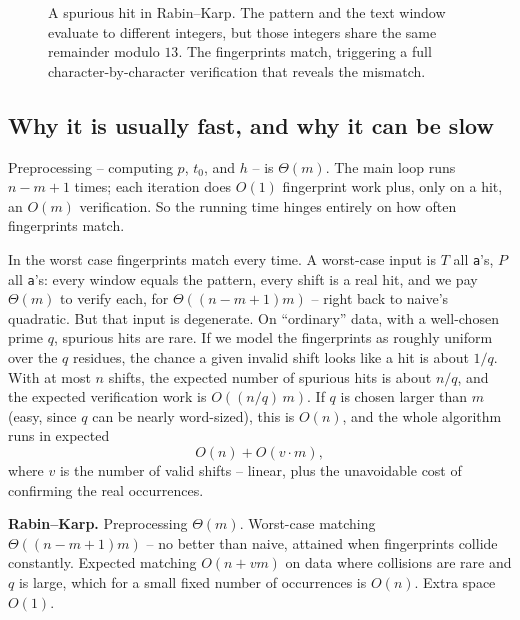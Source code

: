 \begin{labbox}
\begin{figure}[H]
\caption{A spurious hit in Rabin--Karp. The pattern and the text window evaluate to different integers, but those integers share the same remainder modulo $13$. The fingerprints match, triggering a full character-by-character verification that reveals the mismatch.}
\label{ch31:fig-spurious}
\end{figure}
\end{labbox}

\subsection{Why it is usually fast, and why it can be slow}

Preprocessing -- computing $p$, $t_0$, and $h$ -- is $\Theta(m)$. The main loop
runs $n-m+1$ times; each iteration does $O(1)$ fingerprint work plus, only on a
hit, an $O(m)$ verification. So the running time hinges entirely on how often
fingerprints match.

In the worst case fingerprints match every time. A worst-case input is $T$ all
\texttt{a}'s, $P$ all \texttt{a}'s: every window equals the pattern, every shift
is a real hit, and we pay $\Theta(m)$ to verify each, for $\Theta((n-m+1)m)$ --
right back to naive's quadratic. But that input is degenerate. On ``ordinary''
data, with a well-chosen prime $q$, spurious hits are rare. If we model the
fingerprints as roughly uniform over the $q$ residues, the chance a given
invalid shift looks like a hit is about $1/q$. With at most $n$ shifts, the
expected number of spurious hits is about $n/q$, and the expected verification
work is $O((n/q)\,m)$. If $q$ is chosen larger than $m$ (easy, since $q$ can be
nearly word-sized), this is $O(n)$, and the whole algorithm runs in expected
\[
  O(n) + O(v\cdot m),
\]
where $v$ is the number of valid shifts -- linear, plus the unavoidable cost of
confirming the real occurrences.

\begin{complexitybox}
\textbf{Rabin--Karp.} Preprocessing $\Theta(m)$. Worst-case matching
$\Theta((n-m+1)m)$ -- no better than naive, attained when fingerprints collide
constantly. Expected matching $O(n + vm)$ on data where collisions are rare and
$q$ is large, which for a small fixed number of occurrences is $O(n)$. Extra
space $O(1)$.
\end{complexitybox}

